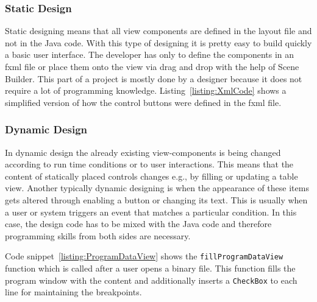 \subsubsection{Static Design}
Static designing means that all view components are defined in the layout file and not in the Java code. With this type of designing it is pretty easy to build quickly a basic user interface. The developer has only to define the components in an fxml file or place them onto the view via drag and drop with the help of Scene Builder. This part of a project is mostly done by a designer because it does not require a lot of programming knowledge. Listing~\ref{listing:XmlCode} shows a simplified version of how the control buttons were defined in the fxml file.


\subsubsection{Dynamic Design}
In dynamic design the already existing view-components is being changed according to run time conditions or to user interactions. This means that the content of statically placed controls changes e.g., by filling or updating a table view. Another typically dynamic designing is when the appearance of these items gets altered through enabling a button or changing its text. This is usually when a user or system triggers an event that matches a particular condition. In this case, the design code has to be mixed with the Java code and therefore programming skills from both sides are necessary. 

Code snippet~\ref{listing:ProgramDataView} shows the \texttt{fillProgramDataView} function which is called after a user opens a binary file. This function fills the program window with the content and additionally inserts a \texttt{CheckBox} to each line for maintaining the breakpoints.
  
